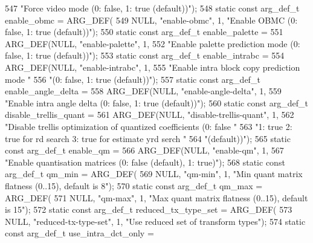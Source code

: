 \begin{DoxyCodeInclude}
{{{{{{{547             \textcolor{stringliteral}{"Force video mode (0: false, 1: true (default))"});
548 \textcolor{keyword}{static} \textcolor{keyword}{const} arg\_def\_t enable\_obmc = ARG\_DEF(
549     NULL, \textcolor{stringliteral}{"enable-obmc"}, 1, \textcolor{stringliteral}{"Enable OBMC (0: false, 1: true (default))"});
550 \textcolor{keyword}{static} \textcolor{keyword}{const} arg\_def\_t enable\_palette =
551     ARG\_DEF(NULL, \textcolor{stringliteral}{"enable-palette"}, 1,
552             \textcolor{stringliteral}{"Enable palette prediction mode (0: false, 1: true (default))"});
553 \textcolor{keyword}{static} \textcolor{keyword}{const} arg\_def\_t enable\_intrabc =
554     ARG\_DEF(NULL, \textcolor{stringliteral}{"enable-intrabc"}, 1,
555             \textcolor{stringliteral}{"Enable intra block copy prediction mode "}
556             \textcolor{stringliteral}{"(0: false, 1: true (default))"});
557 \textcolor{keyword}{static} \textcolor{keyword}{const} arg\_def\_t enable\_angle\_delta =
558     ARG\_DEF(NULL, \textcolor{stringliteral}{"enable-angle-delta"}, 1,
559             \textcolor{stringliteral}{"Enable intra angle delta (0: false, 1: true (default))"});
560 \textcolor{keyword}{static} \textcolor{keyword}{const} arg\_def\_t disable\_trellis\_quant =
561     ARG\_DEF(NULL, \textcolor{stringliteral}{"disable-trellis-quant"}, 1,
562             \textcolor{stringliteral}{"Disable trellis optimization of quantized coefficients (0: false "}
563             \textcolor{stringliteral}{"1: true  2: true for rd search 3: true for estimate yrd serch "}
564             \textcolor{stringliteral}{"(default))"});
565 \textcolor{keyword}{static} \textcolor{keyword}{const} arg\_def\_t enable\_qm =
566     ARG\_DEF(NULL, \textcolor{stringliteral}{"enable-qm"}, 1,
567             \textcolor{stringliteral}{"Enable quantisation matrices (0: false (default), 1: true)"});
568 \textcolor{keyword}{static} \textcolor{keyword}{const} arg\_def\_t qm\_min = ARG\_DEF(
569     NULL, \textcolor{stringliteral}{"qm-min"}, 1, \textcolor{stringliteral}{"Min quant matrix flatness (0..15), default is 8"});
570 \textcolor{keyword}{static} \textcolor{keyword}{const} arg\_def\_t qm\_max = ARG\_DEF(
571     NULL, \textcolor{stringliteral}{"qm-max"}, 1, \textcolor{stringliteral}{"Max quant matrix flatness (0..15), default is 15"});
572 \textcolor{keyword}{static} \textcolor{keyword}{const} arg\_def\_t reduced\_tx\_type\_set = ARG\_DEF(
573     NULL, \textcolor{stringliteral}{"reduced-tx-type-set"}, 1, \textcolor{stringliteral}{"Use reduced set of transform types"});
574 \textcolor{keyword}{static} \textcolor{keyword}{const} arg\_def\_t use\_intra\_dct\_only =
}}}}}}}
\end{DoxyCodeInclude}
